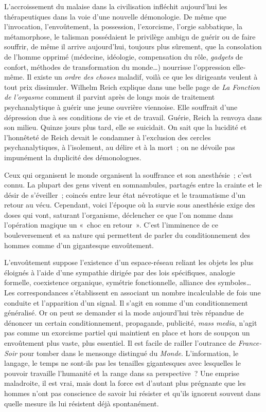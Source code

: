\documentclass[french,twoside]{book} %
\begin{document}
\noindent L’accroissement du malaise dans la civilisation infléchit aujourd’hui les thérapeutiques dans la voie d’une nouvelle démonologie. De même que l’invocation, l’envoûtement, la possession, l’exorcisme, l’orgie sabbatique, la métamorphose, le talisman possédaient le privilège ambigu de guérir ou de faire souffrir, de même il arrive aujourd’hui, toujours plus sûrement, que la consolation de l’homme opprimé (médecine, idéologie, compensation du rôle, \emph{gadgets} de confort, méthodes de transformation du monde…) nourrisse l’oppression elle-même. Il existe un \emph{ordre des choses} maladif, voilà ce que les dirigeants veulent à tout prix dissimuler. Wilhelm Reich explique dans une belle page de \emph{La Fonction de l’orgasme} comment il parvint après de longs mois de traitement psychanalytique à guérir une jeune ouvrière viennoise. Elle souffrait d’une dépression due à ses conditions de vie et de travail. Guérie, Reich la renvoya dans son milieu. Quinze jours plus tard, elle se suicidait. On sait que la lucidité et l’honnêteté de Reich devait le condamner à l’exclusion des cercles psychanalytiques, à l’isolement, au délire et à la mort ; on ne dévoile pas impunément la duplicité des démonologues.\par
Ceux qui organisent le monde organisent la souffrance et son anesthésie ; c’est connu. La plupart des gens vivent en somnambules, partagés entre la crainte et le désir de s’éveiller ; coincés entre leur état névrotique et le traumatisme d’un retour au vécu. Cependant, voici l’époque où la survie sous anesthésie exige des doses qui vont, saturant l’organisme, déclencher ce que l’on nomme dans l’opération magique un « choc en retour ». C’est l’imminence de ce bouleversement et sa nature qui permettent de parler du conditionnement des hommes comme d’un gigantesque envoûtement.\par
L’envoûtement suppose l’existence d’un espace-réseau reliant les objets les plus éloignés à l’aide d’une sympathie dirigée par des lois spécifiques, analogie formelle, coexistence organique, symétrie fonctionnelle, alliance des symboles… Les correspondances s’établissent en associant un nombre incalculable de fois une conduite et l’apparition d’un signal. Il s’agit en somme d’un conditionnement généralisé. Or on peut se demander si la mode aujourd’hui très répandue de dénoncer un certain conditionnement, propagande, publicité, \emph{mass media}, n’agit pas comme un exorcisme partiel qui maintient en place et hors de soupçon un envoûtement plus vaste, plus essentiel. Il est facile de railler l’outrance de \emph{France-Soir} pour tomber dans le mensonge distingué du \emph{Monde}. L’information, le langage, le temps ne sont-ils pas les tenailles gigantesques avec lesquelles le pouvoir travaille l’humanité et la range dans sa perspective ? Une emprise maladroite, il est vrai, mais dont la force est d’autant plus prégnante que les hommes n’ont pas conscience de savoir lui résister et qu’ils ignorent souvent dans quelle mesure ils lui résistent déjà spontanément.\par
\end{document}
